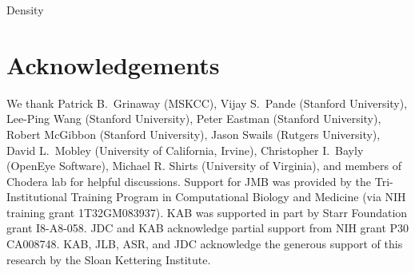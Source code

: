 \documentclass[aps,pre,twocolumn,nofootinbib,superscriptaddress,linenumbers]{revtex4-1}
\begin{document}
Density 


\section{Acknowledgements}

We thank Patrick B.~Grinaway (MSKCC), Vijay S.~Pande (Stanford University), Lee-Ping Wang (Stanford University), Peter Eastman (Stanford University), Robert McGibbon (Stanford University), Jason Swails (Rutgers University), David L.~Mobley (University of California, Irvine), Christopher I.~Bayly (OpenEye Software), Michael R. Shirts (University of Virginia), and members of Chodera lab for helpful discussions.  
Support for JMB was provided by the Tri-Institutional Training Program in Computational Biology and Medicine (via NIH training grant 1T32GM083937).  KAB was supported in part by Starr Foundation grant I8-A8-058.  JDC and KAB acknowledge partial support from NIH grant P30 CA008748.  KAB, JLB, ASR, and JDC acknowledge the generous support of this research by the Sloan Kettering Institute.



\end{document}
